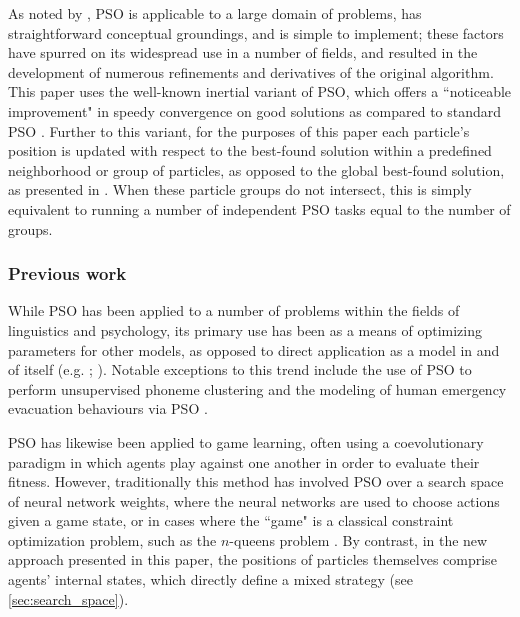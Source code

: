 \documentclass[12pt,a4paper]{article}
\begin{document}
As noted by \citet*[p.~99]{yang2014}, PSO is applicable to a large domain of problems, has straightforward conceptual groundings, and is simple to implement; these factors have spurred on its widespread use in a number of fields, and resulted in the development of numerous refinements and derivatives of the original algorithm. This paper uses the well-known inertial variant of PSO, which offers a ``noticeable improvement" in speedy convergence on good solutions as compared to standard PSO \citep[p.~101]{yang2014}. Further to this variant, for the purposes of this paper each particle's position is updated with respect to the best-found solution within a predefined neighborhood or group of particles, as opposed to the global best-found solution, as presented in \citet*[p.~79]{solnon2010}. When these particle groups do not intersect, this is simply equivalent to running a number of independent PSO tasks equal to the number of groups.



\subsubsection{Previous work}
\label{sec:pso_prev_work}

While PSO has been applied to a number of problems within the fields of linguistics and psychology, its primary use has been as a means of optimizing parameters for other models, as opposed to direct application as a model in and of itself (e.g. \citeauthor{chatterjee2005} \citeyear{chatterjee2005}; \citeauthor{mehdad2009} \citeyear{mehdad2009}). Notable exceptions to this trend include the use of PSO to perform unsupervised phoneme clustering \citep{ahmadi2007} and the modeling of human emergency evacuation behaviours via PSO \citep{cheng2008}.

PSO has likewise been applied to game learning, often using a coevolutionary paradigm in which agents play against one another in order to evaluate their fitness. However, traditionally this method has involved PSO over a search space of neural network weights, where the neural networks are used to choose actions given a game state, or in cases where the ``game" is a classical constraint optimization problem, such as the $n$-queens problem \citep[p.~349-351]{engelbrecht2005}. By contrast, in the new approach presented in this paper, the positions of particles themselves comprise agents' internal states, which directly define a mixed strategy (see \autoref{sec:search_space}).  
\end{document}
